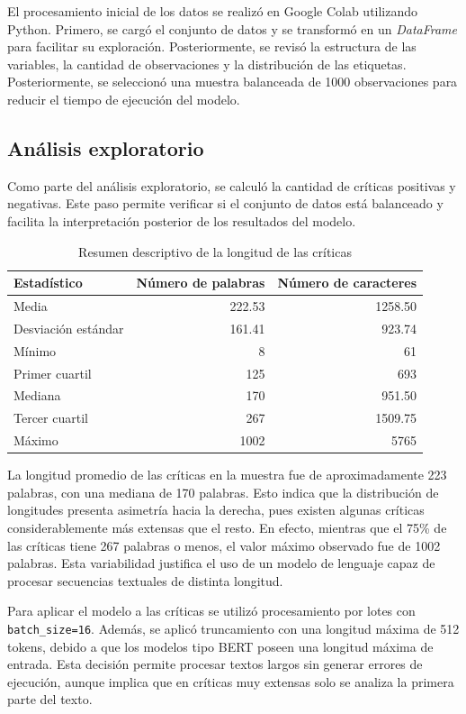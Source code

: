 \documentclass[11pt,letterpaper]{article}
\begin{document}
	El procesamiento inicial de los datos se realizó en Google Colab utilizando Python. Primero, se cargó el conjunto de datos y se transformó en un \textit{DataFrame} para facilitar su exploración. Posteriormente, se revisó la estructura de las variables, la cantidad de observaciones y la distribución de las etiquetas. Posteriormente, se seleccionó una muestra balanceada de 1000 observaciones para reducir el tiempo de ejecución del modelo.
	
	\subsection{Análisis exploratorio}
	
	Como parte del análisis exploratorio, se calculó la cantidad de críticas positivas y negativas. Este paso permite verificar si el conjunto de datos está balanceado y facilita la interpretación posterior de los resultados del modelo.
	
	\begin{table}[H]
		\centering
		\caption{Resumen descriptivo de la longitud de las críticas}
		\label{tab:longitud-criticas}
		\begin{tabular}{lrr}
			\toprule
			Estadístico & Número de palabras & Número de caracteres \\
			\midrule
			Media & 222.53 & 1258.50 \\
			Desviación estándar & 161.41 & 923.74 \\
			Mínimo & 8 & 61 \\
			Primer cuartil & 125 & 693 \\
			Mediana & 170 & 951.50 \\
			Tercer cuartil & 267 & 1509.75 \\
			Máximo & 1002 & 5765 \\
			\bottomrule
		\end{tabular}
	\end{table}
	La longitud promedio de las críticas en la muestra fue de aproximadamente 223 palabras, con una mediana de 170 palabras. Esto indica que la distribución de longitudes presenta asimetría hacia la derecha, pues existen algunas críticas considerablemente más extensas que el resto. En efecto, mientras que el 75\% de las críticas tiene 267 palabras o menos, el valor máximo observado fue de 1002 palabras. Esta variabilidad justifica el uso de un modelo de lenguaje capaz de procesar secuencias textuales de distinta longitud.
	
	Para aplicar el modelo a las críticas se utilizó procesamiento por lotes con \texttt{batch\_size=16}. Además, se aplicó truncamiento con una longitud máxima de 512 tokens, debido a que los modelos tipo BERT poseen una longitud máxima de entrada. Esta decisión permite procesar textos largos sin generar errores de ejecución, aunque implica que en críticas muy extensas solo se analiza la primera parte del texto.
	
\end{document}
